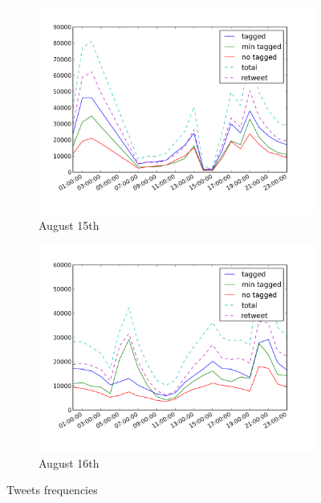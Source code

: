 \documentclass[a4paper,twoside,12pt,openright]{report}
\begin{document}
\begin{figure}[H]
\begin{subfigure}[t]{0.48\textwidth}
\begin{center}
	\includegraphics[width=\textwidth]{images/freqs/freq_15_08.png}
	\caption{August 15th}
\end{center}
\end{subfigure}
\hfill
\begin{subfigure}[t]{0.48\textwidth}
\begin{center}
	\includegraphics[width=\textwidth]{images/freqs/freq_16_08.png}
	\caption{August 16th}
\end{center}
\end{subfigure}
\caption{Tweets frequencies}
\label{freqTweets}
\end{figure}
\end{document}
